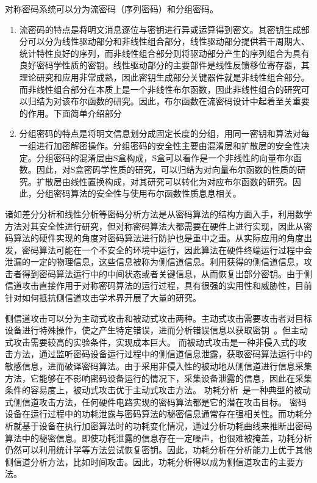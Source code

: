 \documentclass[a4paper,zihao=-4,AutoFakeBold]{ctexart}
\begin{document}
对称密码系统可以分为流密码（序列密码）和分组密码。
\begin{enumerate}[label=(\arabic{*})]
    \item 流密码的特点是将明文消息逐位与密钥进行异或运算得到密文。其密钥生成部分可以分为线性驱动部分和非线性组合部分，线性驱动部分提供若干周期大、统计特性良好的序列，而非线性组合部分则将驱动部分产生的序列组合为具有良好密码学性质的密钥。线性驱动部分的主要部件是线性反馈移位寄存器，其理论研究和应用非常成熟，因此密钥生成部分关键器件就是非线性组合部分。而非线性组合部分在本质上是一个非线性布尔函数，因此非线性组合的研究可以归结为对该布尔函数的研究。因此，布尔函数在流密码设计中起着至关重要的作用。下面简单介绍部分
    \item 分组密码的特点是将明文信息划分成固定长度的分组，用同一密钥和算法对每一组进行加密解密操作。分组密码的安全性主要由混淆层和扩散层的安全性决定。分组密码的混淆层由S盒构成，S盒可以看作是一个非线性的向量布尔函数。因此，对S盒密码学性质的研究，可以归结为对向量布尔函数的性质的研究。扩散层由线性置换构成，对其研究可以转化为对应布尔函数的研究。因此，分组密码算法的安全性与使用布尔函数性质息息相关。
\end{enumerate}

诸如差分分析和线性分析等密码分析方法是从密码算法的结构方面入手，利用数学方法对其安全性进行研究，但对称密码算法大都需要在硬件上进行实现，因此从密码算法的硬件实现的角度对密码算法进行防护也是重中之重。从实际应用的角度出发，密码算法可能在一个不安全的环境中运行，因此算法在硬件终端运行过程中会泄漏的一定的物理信息，这些信息被称为侧信道信息。利用获得的侧信道信息，攻击者得到密码算法运行中的中间状态或者关键信息，从而恢复出部分密钥。由于侧信道攻击直接作用于对称密码算法的运行过程，具有很强的实用性和威胁性，目前针对如何抵抗侧信道攻击学术界开展了大量的研究。

侧信道攻击可以分为主动式攻击和被动式攻击两种。主动式攻击需要攻击者对目标设备进行特殊操作，使之产生特定错误，进而分析错误信息以获取密钥~\cite{FaultAttack97}。但主动式攻击需要较高的实验条件，实现成本巨大。
而被动式攻击是一种非侵入式的攻击方法，通过监听密码设备运行过程中的侧信道信息泄露，获取密码算法运行中的敏感信息，进而破译密码算法。由于采用非侵入性的被动地从侧信道进行信息采集方法，它能够在不影响密码设备运行的情况下，采集设备泄露的信息，因此在采集条件的容易度上，被动式攻击优于主动式攻击方法。
功耗分析~\cite{KocherDPA99}是一种典型的被动式侧信道攻击方法，任何硬件电路实现的密码算法都是它的潜在攻击目标。
密码设备在运行过程中的功耗泄露与密码算法的秘密信息通常存在强相关性。而功耗分析就基于设备在执行加密算法时的功耗变化情况，通过分析功耗曲线来推断出密码算法中的秘密信息。即使功耗泄露的信息存在一定噪声，也很难被掩盖，功耗分析仍然可以利用统计学等方法尝试恢复密钥。因此，功耗分析在分析能力上优于其他侧信道分析方法，比如时间攻击。因此，功耗分析得以成为侧信道攻击的主要方法。
\end{document}

